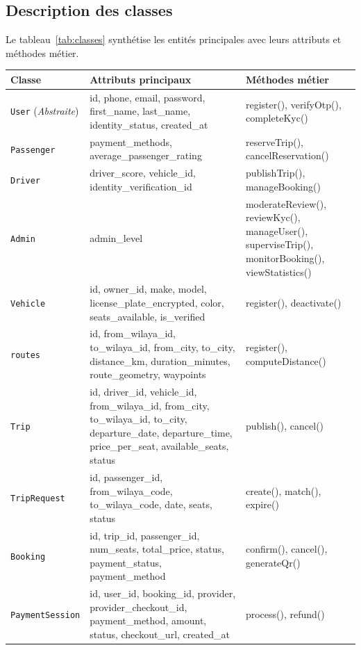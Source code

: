 \begin{landscape}
\subsection{Description des classes}
\label{sec:classes-description}

Le tableau~\ref{tab:classes} synthétise les entités principales avec leurs attributs et méthodes métier.

\begin{table}[H]
\centering
\scriptsize
\renewcommand{\arraystretch}{1.1}
\begin{tabularx}{\linewidth}{|l|X|X|}
\hline
\rowcolor{rohlight}
\textbf{Classe} & \textbf{Attributs principaux} & \textbf{Méthodes métier} \\
\hline
\texttt{User} (\textit{Abstraite}) & id, phone, email, password, first\_name, last\_name, identity\_status, created\_at & register(), verifyOtp(), completeKyc() \\
\hline
\texttt{Passenger} & payment\_methods, average\_passenger\_rating & reserveTrip(), cancelReservation() \\
\hline
\texttt{Driver} & driver\_score, vehicle\_id, identity\_verification\_id & publishTrip(), manageBooking() \\
\hline
\texttt{Admin} & admin\_level & moderateReview(), reviewKyc(), manageUser(), superviseTrip(), monitorBooking(), viewStatistics() \\
\hline
\texttt{Vehicle} & id, owner\_id, make, model, license\_plate\_encrypted, color, seats\_available, is\_verified & register(), deactivate() \\
\hline
\texttt{routes} & id, from\_wilaya\_id, to\_wilaya\_id, from\_city, to\_city, distance\_km, duration\_minutes, route\_geometry, waypoints & register(), computeDistance() \\
\hline
\texttt{Trip} & id, driver\_id, vehicle\_id, from\_wilaya\_id, from\_city, to\_wilaya\_id, to\_city, departure\_date, departure\_time, price\_per\_seat, available\_seats, status & publish(), cancel() \\
\hline
\texttt{TripRequest} & id, passenger\_id, from\_wilaya\_code, to\_wilaya\_code, date, seats, status & create(), match(), expire() \\
\hline
\texttt{Booking} & id, trip\_id, passenger\_id, num\_seats, total\_price, status, payment\_status, payment\_method & confirm(), cancel(), generateQr() \\
\hline
\texttt{PaymentSession} & id, user\_id, booking\_id, provider, provider\_checkout\_id, payment\_method, amount, status, checkout\_url, created\_at & process(), refund() \\

\end{tabularx}
\end{table}
\end{landscape}

